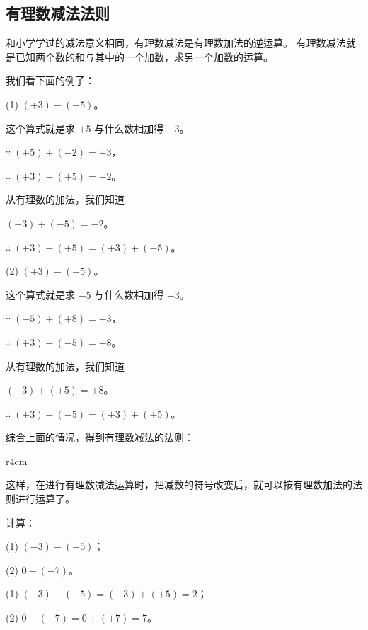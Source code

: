 \subsection{有理数减法法则}\label{subsec:1-8}

和小学学过的减法意义相同，有理数减法是有理数加法的逆运算。
有理数减法就是已知两个数的和与其中的一个加数，求另一个加数的运算。

我们看下面的例子：

(1) \quad $(+3) - (+5)$。

这个算式就是求 $+5$ 与什么数相加得 $+3$。

$\because \; (+5) + (-2) = +3$，

$\therefore \; (+3) - (+5) = -2$。

从有理数的加法，我们知道

\hspace*{2em} $(+3) + (-5) = -2$。

$\therefore \; (+3) - (+5) = (+3) + (-5)$。

(2) \quad $(+3) - (-5)$。

这个算式就是求 $-5$ 与什么数相加得 $+3$。

$\because \; (-5) + (+8) = +3$，

$\therefore \; (+3) - (-5) = +8$。

从有理数的加法，我们知道

\hspace*{2em} $(+3) + (+5) = +8$。

$\therefore \; (+3) - (-5) = (+3) + (+5)$。

综合上面的情况，得到有理数减法的法则：


\begin{wrapfigure}{r}{4cm}
    \centering
    \caption{}\label{fig:1-17}
\end{wrapfigure}

这样，在进行有理数减法运算时，把减数的符号改变后，就可以按有理数加法的法则进行运算了。

\liti 计算：

(1) \quad $(-3) - (-5)$；

(2) \quad $0 - (-7)$。

\jie (1) \quad $(-3) - (-5) = (-3) + (+5) = 2$；

(2) \quad $0 - (-7) = 0 + (+7) = 7$。



